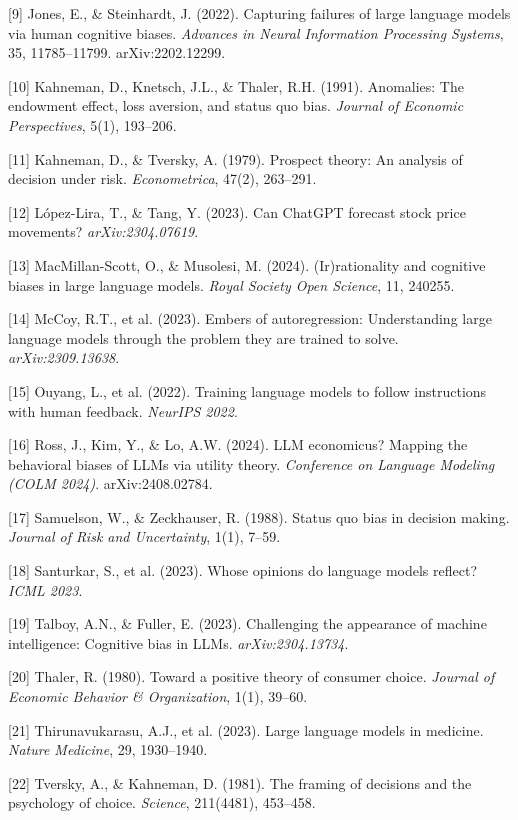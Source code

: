 \documentclass{article}
\begin{document}
[9] Jones, E., \& Steinhardt, J. (2022). Capturing failures of large language models
via human cognitive biases. \textit{Advances in Neural Information Processing Systems},
35, 11785--11799. arXiv:2202.12299.

[10] Kahneman, D., Knetsch, J.L., \& Thaler, R.H. (1991). Anomalies: The
endowment effect, loss aversion, and status quo bias. \textit{Journal of
Economic Perspectives}, 5(1), 193--206.

[11] Kahneman, D., \& Tversky, A. (1979). Prospect theory: An analysis of
decision under risk. \textit{Econometrica}, 47(2), 263--291.

[12] L\'{o}pez-Lira, T., \& Tang, Y. (2023). Can ChatGPT forecast stock
price movements? \textit{arXiv:2304.07619}.

[13] MacMillan-Scott, O., \& Musolesi, M. (2024). (Ir)rationality and
cognitive biases in large language models. \textit{Royal Society Open
Science}, 11, 240255.

[14] McCoy, R.T., et al. (2023). Embers of autoregression: Understanding
large language models through the problem they are trained to solve.
\textit{arXiv:2309.13638}.

[15] Ouyang, L., et al. (2022). Training language models to follow
instructions with human feedback. \textit{NeurIPS 2022}.

[16] Ross, J., Kim, Y., \& Lo, A.W. (2024). LLM economicus? Mapping the behavioral
biases of LLMs via utility theory. \textit{Conference on Language Modeling (COLM 2024)}.
arXiv:2408.02784.

[17] Samuelson, W., \& Zeckhauser, R. (1988). Status quo bias in decision
making. \textit{Journal of Risk and Uncertainty}, 1(1), 7--59.

[18] Santurkar, S., et al. (2023). Whose opinions do language models
reflect? \textit{ICML 2023}.

[19] Talboy, A.N., \& Fuller, E. (2023). Challenging the appearance of
machine intelligence: Cognitive bias in LLMs. \textit{arXiv:2304.13734}.

[20] Thaler, R. (1980). Toward a positive theory of consumer choice.
\textit{Journal of Economic Behavior \& Organization}, 1(1), 39--60.

[21] Thirunavukarasu, A.J., et al. (2023). Large language models in
medicine. \textit{Nature Medicine}, 29, 1930--1940.

[22] Tversky, A., \& Kahneman, D. (1981). The framing of decisions and
the psychology of choice. \textit{Science}, 211(4481), 453--458.
\end{document}
